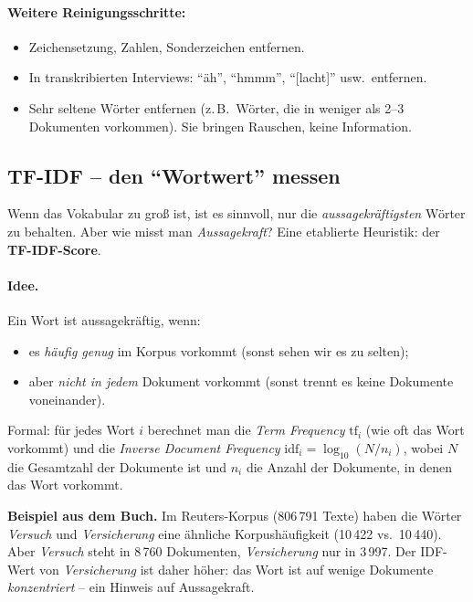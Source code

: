 \documentclass[a4paper,11pt]{article}
\begin{document}
\paragraph{Weitere Reinigungsschritte:}
\begin{itemize}
\item Zeichensetzung, Zahlen, Sonderzeichen entfernen.
\item In transkribierten Interviews: \enquote{äh}, \enquote{hmmm},
\enquote{[lacht]} usw.\ entfernen.
\item Sehr seltene Wörter entfernen (z.\,B.\ Wörter, die in weniger
als 2--3 Dokumenten vorkommen). Sie bringen Rauschen, keine
Information.
\end{itemize}

\subsection{TF-IDF -- den \enquote{Wortwert} messen}

Wenn das Vokabular zu groß ist, ist es sinnvoll, nur die
\emph{aussagekräftigsten} Wörter zu behalten. Aber wie misst man
\emph{Aussagekraft}? Eine etablierte Heuristik: der
\textbf{TF-IDF-Score}.

\paragraph{Idee.} Ein Wort ist aussagekräftig, wenn:
\begin{itemize}
\item es \emph{häufig genug} im Korpus vorkommt (sonst sehen wir es
zu selten);
\item aber \emph{nicht in jedem} Dokument vorkommt (sonst trennt es
keine Dokumente voneinander).
\end{itemize}

Formal: für jedes Wort $i$ berechnet man die \emph{Term Frequency}
$\mathrm{tf}_i$ (wie oft das Wort vorkommt) und die \emph{Inverse
Document Frequency} $\mathrm{idf}_i = \log_{10}(N / n_i)$, wobei $N$
die Gesamtzahl der Dokumente ist und $n_i$ die Anzahl der Dokumente,
in denen das Wort vorkommt.

\begin{merkbox}
\textbf{Beispiel aus dem Buch.} Im Reuters-Korpus (806\,791 Texte)
haben die Wörter \emph{Versuch} und \emph{Versicherung} eine ähnliche
Korpushäufigkeit (10\,422 vs.\ 10\,440). Aber \emph{Versuch} steht in
8\,760 Dokumenten, \emph{Versicherung} nur in 3\,997. Der IDF-Wert
von \emph{Versicherung} ist daher höher: das Wort ist auf wenige
Dokumente \emph{konzentriert} -- ein Hinweis auf Aussagekraft.
\end{merkbox}
\end{document}

